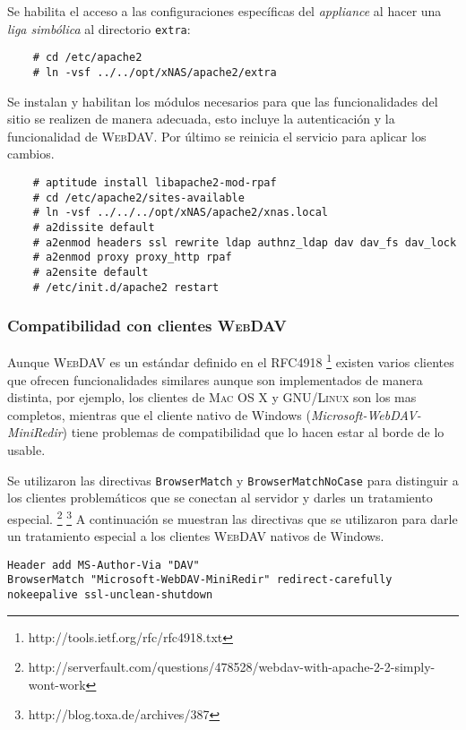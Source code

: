 Se habilita el acceso a las configuraciones espec\'{i}ficas del \textit{appliance} al hacer una \textit{liga simb\'{o}lica} al directorio \texttt{extra}:

{
\scriptsize
\linespread{1}
\begin{verbatim}
    # cd /etc/apache2
    # ln -vsf ../../opt/xNAS/apache2/extra
\end{verbatim}
}

Se instalan y habilitan los m\'{odulos} necesarios para que las funcionalidades del sitio se realizen de manera adecuada, esto incluye la autenticaci\'{o}n y la funcionalidad de \textsc{WebDAV}. Por \'{u}ltimo se reinicia el servicio para aplicar los cambios.

{
\scriptsize
\linespread{1}
\begin{verbatim}
    # aptitude install libapache2-mod-rpaf
    # cd /etc/apache2/sites-available
    # ln -vsf ../../../opt/xNAS/apache2/xnas.local
    # a2dissite default
    # a2enmod headers ssl rewrite ldap authnz_ldap dav dav_fs dav_lock
    # a2enmod proxy proxy_http rpaf
    # a2ensite default
    # /etc/init.d/apache2 restart
\end{verbatim}
}

        \subsubsection {Compatibilidad con clientes \textsc{WebDAV}}

Aunque \textsc{WebDAV} es un est\'{a}ndar definido en el RFC4918 \footnote{http://tools.ietf.org/rfc/rfc4918.txt} existen varios clientes que ofrecen funcionalidades similares aunque son implementados de manera distinta, por ejemplo, los clientes de \textsc{Mac OS X} y \textsc{GNU/Linux} son los mas completos, mientras que el cliente nativo de Windows (\textit{Microsoft-WebDAV-MiniRedir}) tiene problemas de compatibilidad que lo hacen estar al borde de lo usable.

Se utilizaron las directivas \texttt{BrowserMatch} y \texttt{BrowserMatchNoCase} para distinguir a los clientes problem\'{a}ticos que se conectan al servidor y darles un tratamiento especial. \footnote{http://serverfault.com/questions/478528/webdav-with-apache-2-2-simply-wont-work} \footnote{http://blog.toxa.de/archives/387} A continuaci\'{o}n se muestran las directivas que se utilizaron para darle un tratamiento especial a los clientes \textsc{WebDAV} nativos de Windows.

{
\scriptsize
\linespread{1}
\begin{verbatim}
Header add MS-Author-Via "DAV" 
BrowserMatch "Microsoft-WebDAV-MiniRedir" redirect-carefully nokeepalive ssl-unclean-shutdown 
\end{verbatim}
}

